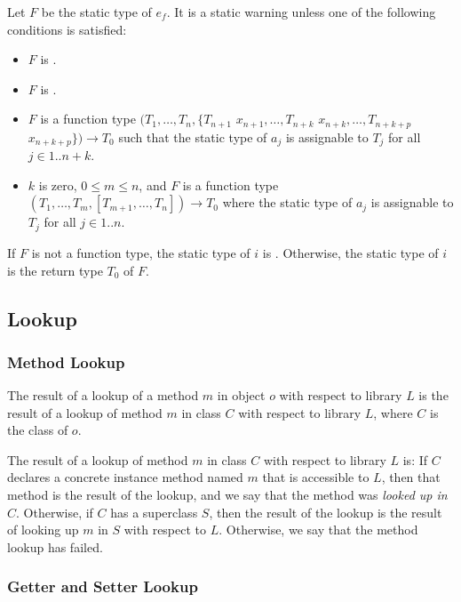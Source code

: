 \documentclass{article}
\begin{document}
\LMHash{}
Let $F$ be the static type of $e_f$.
It is a static warning unless one of the following conditions is satisfied:
\begin{itemize}
\item $F$ is \DYNAMIC{}.
\item $F$ is .
\item $F$ is a function type
  $(T_1, \ldots, T_n,
  \{T_{n+1}$ $x_{n+1}, \ldots, T_{n+k}$ $x_{n+k}, \ldots, T_{n+k+p}$ $x_{n+k+p}\})
  \rightarrow T_0$
such that the static type of $a_j$ is assignable to $T_j$ for all
$j \in 1 .. n+k$.
\item $k$ is zero, $0 \leq m \leq n$, and $F$ is a function type
$(T_1, \ldots, T_m, [T_{m+1}, \ldots, T_n]) \rightarrow T_0$
where the static type of $a_j$ is assignable to $T_j$ for all $j \in 1 .. n$.
\end{itemize}
If $F$ is not a function type, the static type of $i$ is \DYNAMIC{}.
Otherwise, the static type of $i$ is the return type $T_0$ of $F$.


\subsection{Lookup}


\subsubsection{Method Lookup}

\LMHash{}
The result of a lookup of a method $m$ in object $o$ with respect to library $L$ is the result of a lookup of method $m$ in class $C$ with respect to library $L$, where $C$ is the class of $o$.

\LMHash{}
The result of a lookup of method $m$ in class $C$ with respect to library $L$ is:
If $C$ declares a concrete instance method named $m$ that is accessible to $L$, then that method is the result of the lookup, and we say that the method was {\em looked up in $C$}.
Otherwise, if $C$ has a superclass $S$, then the result of the lookup is the result of looking up $m$ in $S$ with respect to $L$.
Otherwise, we say that the method lookup has failed.



\subsubsection{Getter and Setter Lookup}
\end{document}
